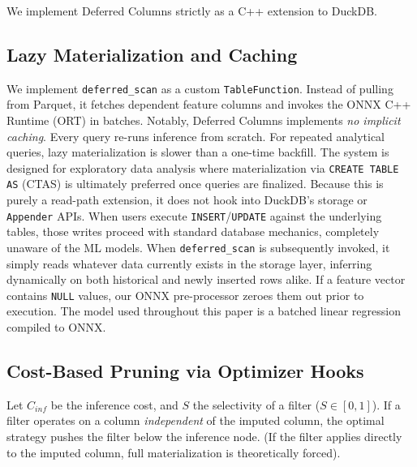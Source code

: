 \documentclass[conference]{IEEEtran}
\begin{document}
We implement Deferred Columns strictly as a C++ extension to DuckDB. 

\subsection{Lazy Materialization and Caching}
We implement \texttt{deferred\_scan} as a custom \texttt{TableFunction}. Instead of pulling from Parquet, it fetches dependent feature columns and invokes the ONNX C++ Runtime (ORT) in batches. 
Notably, Deferred Columns implements \textit{no implicit caching}. Every query re-runs inference from scratch. For repeated analytical queries, lazy materialization is slower than a one-time backfill. The system is designed for exploratory data analysis where materialization via \texttt{CREATE TABLE AS} (CTAS) is ultimately preferred once queries are finalized. 
Because this is purely a read-path extension, it does not hook into DuckDB's storage or \texttt{Appender} APIs. When users execute \texttt{INSERT}/\texttt{UPDATE} against the underlying tables, those writes proceed with standard database mechanics, completely unaware of the ML models. When \texttt{deferred\_scan} is subsequently invoked, it simply reads whatever data currently exists in the storage layer, inferring dynamically on both historical and newly inserted rows alike. If a feature vector contains \texttt{NULL} values, our ONNX pre-processor zeroes them out prior to execution. The model used throughout this paper is a batched linear regression compiled to ONNX.

\subsection{Cost-Based Pruning via Optimizer Hooks}
Let $C_{inf}$ be the inference cost, and $S$ the selectivity of a filter ($S \in [0, 1]$). If a filter operates on a column \textit{independent} of the imputed column, the optimal strategy pushes the filter below the inference node. (If the filter applies directly to the imputed column, full materialization is theoretically forced).
\end{document}

